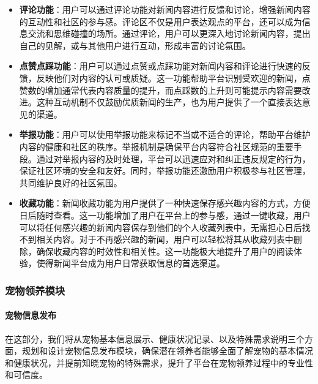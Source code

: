 \begin{itemize}
	\item \textbf{评论功能}：用户可以通过评论功能对新闻内容进行反馈和讨论，增强新闻内容的互动性和社区的参与感。评论区不仅是用户表达观点的平台，还可以成为信息交流和思维碰撞的场所。通过评论，用户可以更深入地讨论新闻内容，提出自己的见解，或与其他用户进行互动，形成丰富的讨论氛围。
	\item \textbf{点赞点踩功能}：用户可以通过点赞或点踩功能对新闻内容和评论进行快速的反馈，反映他们对内容的认可或质疑。这一功能帮助平台识别受欢迎的新闻，点赞数的增加通常代表内容质量的提升，而点踩数的上升则可能提示内容需要改进。这种互动机制不仅鼓励优质新闻的生产，也为用户提供了一个直接表达意见的渠道。
	\item \textbf{举报功能}：用户可以使用举报功能来标记不当或不适合的评论，帮助平台维护内容的健康和社区的秩序。举报机制是确保平台内容符合社区规范的重要手段。通过对举报内容的及时处理，平台可以迅速应对和纠正违反规定的行为，保证社区环境的安全和友好。同时，举报功能还激励用户积极参与社区管理，共同维护良好的社区氛围。
	\item \textbf{收藏功能}：新闻收藏功能为用户提供了一种快速保存感兴趣内容的方式，方便日后随时查看。这一功能增加了用户在平台上的参与感，通过一键收藏，用户可以将任何感兴趣的新闻内容保存到他们的个人收藏列表中，无需担心日后找不到相关内容。对于不再感兴趣的新闻，用户可以轻松将其从收藏列表中删除，确保收藏内容的时效性和相关性。这一功能极大地提升了用户的阅读体验，使得新闻平台成为用户日常获取信息的首选渠道。
\end{itemize}

\subsubsection{宠物领养模块}

\paragraph{宠物信息发布}

在这部分，我们将从宠物基本信息展示、健康状况记录、以及特殊需求说明三个方面，规划和设计宠物信息发布模块，确保潜在领养者能够全面了解宠物的基本情况和健康状况，并提前知晓宠物的特殊需求，提升了平台在宠物领养过程中的专业性和可信度。

